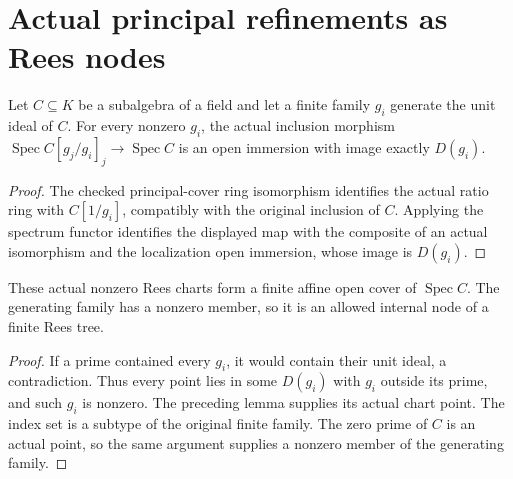 \section{Actual principal refinements as Rees nodes}

\begin{lemma}\label{lem:sc0-principal-rees-open-chart}
\leanok
{}
Let $C\subseteq K$ be a subalgebra of a field and let a finite family $g_i$ generate
the unit ideal of $C$. For every nonzero $g_i$, the actual inclusion morphism
$\operatorname{Spec}C[g_j/g_i]_j\to\operatorname{Spec}C$ is an open immersion
with image exactly $D(g_i)$.
\end{lemma}
\begin{proof}
The checked principal-cover ring isomorphism identifies the actual ratio ring
with $C[1/g_i]$, compatibly with the original inclusion of $C$. Applying the
spectrum functor identifies the displayed map with the composite of an actual
isomorphism and the localization open immersion, whose image is $D(g_i)$.
\end{proof}

\begin{lemma}\label{lem:sc0-principal-rees-finite-cover}
\leanok
{}
These actual nonzero Rees charts form a finite affine open cover of
$\operatorname{Spec}C$. The generating family has a nonzero member, so it is an
allowed internal node of a finite Rees tree.
\end{lemma}
\begin{proof}
If a prime contained every $g_i$, it would contain their unit ideal, a
contradiction. Thus every point lies in some $D(g_i)$ with $g_i$ outside its
prime, and such $g_i$ is nonzero. The preceding lemma supplies its actual chart
point. The index set is a subtype of the original finite family. The zero prime
of $C$ is an actual point, so the same argument supplies a nonzero member of the
generating family.
\end{proof}
